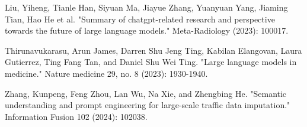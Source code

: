 \documentclass[runningheads]{llncs}
\begin{document}
\begin{thebibliography}{8}

Liu, Yiheng, Tianle Han, Siyuan Ma, Jiayue Zhang, Yuanyuan Yang, Jiaming Tian, Hao He et al. "Summary of chatgpt-related research and perspective towards the future of large language models." Meta-Radiology (2023): 100017.


Thirunavukarasu, Arun James, Darren Shu Jeng Ting, Kabilan Elangovan, Laura Gutierrez, Ting Fang Tan, and Daniel Shu Wei Ting. "Large language models in medicine." Nature medicine 29, no. 8 (2023): 1930-1940.



Zhang, Kunpeng, Feng Zhou, Lan Wu, Na Xie, and Zhengbing He. "Semantic understanding and prompt engineering for large-scale traffic data imputation." Information Fusion 102 (2024): 102038.


\end{thebibliography}
\end{document}
